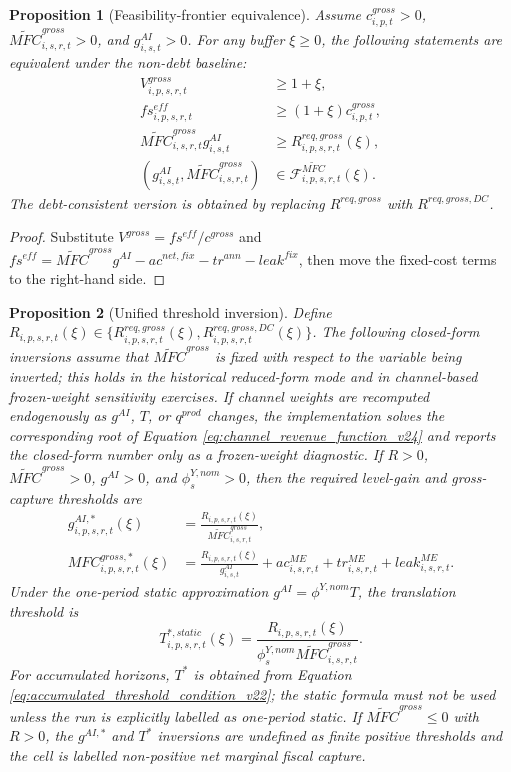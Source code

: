 \documentclass[11pt,a4paper]{article}
\newtheorem{proposition}{Proposition}
\begin{document}
\begin{proposition}[Feasibility-frontier equivalence]\label{prop:frontier_equivalence}
Assume $c^{gross}_{i,p,t}>0$, $\widetilde{MFC}^{gross}_{i,s,r,t}>0$, and $g^{AI}_{i,s,t}>0$. For any buffer $\xi\geq0$, the following statements are equivalent under the non-debt baseline:
\begin{align}
    V^{gross}_{i,p,s,r,t}&\geq1+\xi,\\
    fs^{eff}_{i,p,s,r,t}&\geq(1+\xi)c^{gross}_{i,p,t},\\
    \widetilde{MFC}^{gross}_{i,s,r,t}g^{AI}_{i,s,t}&\geq R^{req,gross}_{i,p,s,r,t}(\xi),\\
    (g^{AI}_{i,s,t},\widetilde{MFC}^{gross}_{i,s,r,t})&\in\mathcal{F}^{\widetilde{MFC}}_{i,p,s,r,t}(\xi).
\end{align}
The debt-consistent version is obtained by replacing $R^{req,gross}$ with $R^{req,gross,DC}$.
\end{proposition}

\begin{proof}
Substitute $V^{gross}=fs^{eff}/c^{gross}$ and $fs^{eff}=\widetilde{MFC}^{gross}g^{AI}-ac^{net,fix}-tr^{ann}-leak^{fix}$, then move the fixed-cost terms to the right-hand side.
\end{proof}

\begin{proposition}[Unified threshold inversion]\label{prop:unified_inversion}
Define $R_{i,p,s,r,t}(\xi)\in\{R^{req,gross}_{i,p,s,r,t}(\xi),R^{req,gross,DC}_{i,p,s,r,t}(\xi)\}$. The following closed-form inversions assume that $\widetilde{MFC}^{gross}$ is fixed with respect to the variable being inverted; this holds in the historical reduced-form mode and in channel-based frozen-weight sensitivity exercises. If channel weights are recomputed endogenously as $g^{AI}$, $T$, or $q^{prod}$ changes, the implementation solves the corresponding root of Equation \eqref{eq:channel_revenue_function_v24} and reports the closed-form number only as a frozen-weight diagnostic. If $R>0$, $\widetilde{MFC}^{gross}>0$, $g^{AI}>0$, and $\phi^{Y,nom}_s>0$, then the required level-gain and gross-capture thresholds are
\begin{align}
    g^{AI,*}_{i,p,s,r,t}(\xi)&=\frac{R_{i,p,s,r,t}(\xi)}{\widetilde{MFC}^{gross}_{i,s,r,t}},\\
    MFC^{gross,*}_{i,p,s,r,t}(\xi)&=\frac{R_{i,p,s,r,t}(\xi)}{g^{AI}_{i,s,t}}+ac^{ME}_{i,s,r,t}+tr^{ME}_{i,s,r,t}+leak^{ME}_{i,s,r,t}.
\end{align}
Under the one-period static approximation $g^{AI}=\phi^{Y,nom}T$, the translation threshold is
\begin{equation}
    T^{*,static}_{i,p,s,r,t}(\xi)=\frac{R_{i,p,s,r,t}(\xi)}{\phi^{Y,nom}_s\widetilde{MFC}^{gross}_{i,s,r,t}}.
\end{equation}
For accumulated horizons, $T^*$ is obtained from Equation \eqref{eq:accumulated_threshold_condition_v22}; the static formula must not be used unless the run is explicitly labelled as one-period static. If $\widetilde{MFC}^{gross}\leq0$ with $R>0$, the $g^{AI,*}$ and $T^*$ inversions are undefined as finite positive thresholds and the cell is labelled non-positive net marginal fiscal capture.
\end{proposition}
\end{document}
